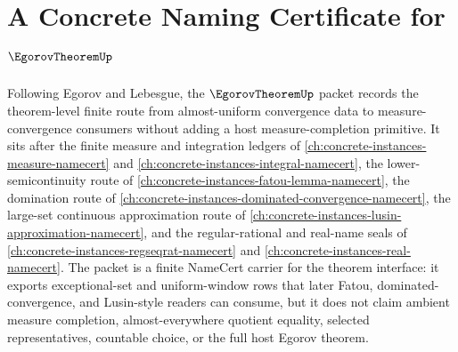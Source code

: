 \chapter{A Concrete Naming Certificate for $\EgorovTheoremUp$}
\label{ch:concrete-instances-egorov-theorem-namecert}

Following Egorov and Lebesgue, the $\EgorovTheoremUp$ packet records the theorem-level finite route from almost-uniform convergence data to measure-convergence consumers without adding a host measure-completion primitive. It sits after the finite measure and integration ledgers of \autoref{ch:concrete-instances-measure-namecert} and \autoref{ch:concrete-instances-integral-namecert}, the lower-semicontinuity route of \autoref{ch:concrete-instances-fatou-lemma-namecert}, the domination route of \autoref{ch:concrete-instances-dominated-convergence-namecert}, the large-set continuous approximation route of \autoref{ch:concrete-instances-lusin-approximation-namecert}, and the regular-rational and real-name seals of \autoref{ch:concrete-instances-regseqrat-namecert} and \autoref{ch:concrete-instances-real-namecert}. The packet is a finite NameCert carrier for the theorem interface: it exports exceptional-set and uniform-window rows that later Fatou, dominated-convergence, and Lusin-style readers can consume, but it does not claim ambient measure completion, almost-everywhere quotient equality, selected representatives, countable choice, or the full host Egorov theorem.

